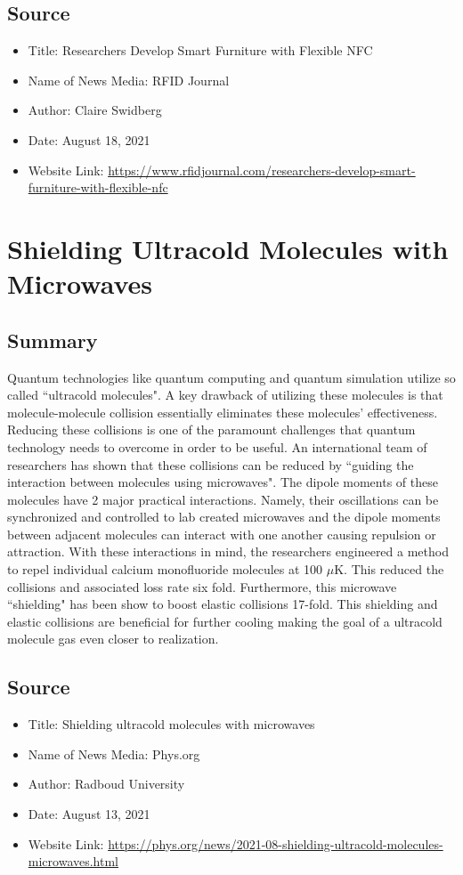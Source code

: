 \documentclass{article}
\begin{document}
\subsection*{Source}
\begin{itemize}
  \item Title: Researchers Develop Smart Furniture with Flexible NFC
  \item Name of News Media: RFID Journal
  \item Author: Claire Swidberg
  \item Date: August 18, 2021
  \item Website Link: \url{https://www.rfidjournal.com/researchers-develop-smart-furniture-with-flexible-nfc}
\end{itemize}

\section*{Shielding Ultracold Molecules with Microwaves}

\subsection*{Summary}
Quantum technologies like quantum computing and quantum simulation 
utilize so called ``ultracold molecules".
A key drawback of utilizing these molecules is that molecule-molecule
collision essentially eliminates these molecules' effectiveness.
Reducing these collisions is one of the paramount challenges that 
quantum technology needs to overcome in order to be useful.
An international team of researchers has shown that these collisions
can be reduced by ``guiding the interaction between molecules using
microwaves". The dipole moments of these molecules have 2 major practical interactions.
Namely, their oscillations can be synchronized and controlled to lab created microwaves and 
the dipole moments between adjacent molecules can interact with one another
causing repulsion or attraction. With these interactions in mind, the researchers engineered a method
to repel individual calcium monofluoride molecules at 100 $\mu$K. This reduced the collisions 
and associated loss rate six fold. Furthermore, this microwave ``shielding" 
has been show to boost elastic collisions 17-fold. This shielding and elastic collisions 
are beneficial for further cooling making the goal of a ultracold molecule
gas even closer to realization.

\subsection*{Source}
\begin{itemize}
  \item Title: Shielding ultracold molecules with microwaves
  \item Name of News Media: Phys.org
  \item Author: Radboud University
  \item Date: August 13, 2021 
  \item Website Link: \url{https://phys.org/news/2021-08-shielding-ultracold-molecules-microwaves.html}
\end{itemize}
\end{document}
